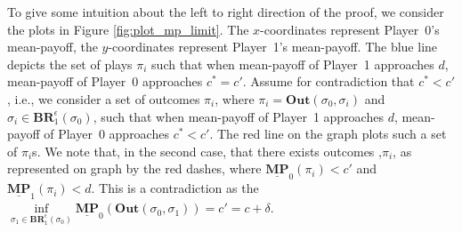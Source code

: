 
To give some intuition about the left to right direction of the proof, we consider the plots in Figure \ref{fig:plot_mp_limit}. The $x$-coordinates represent Player~0's mean-payoff, the $y$-coordinates represent Player~1's mean-payoff. The blue line depicts the set of plays $\pi_i$ such that when mean-payoff of Player~1 approaches $d$, mean-payoff of Player~0 approaches $c^* = c'$. Assume for contradiction that $c^* < c'$, i.e., we consider a set of outcomes $\pi_i$, where $\pi_i=\mathbf{Out}(\sigma_0, \sigma_i)$ and $\sigma_i \in \mathbf{BR}_1^{\epsilon}(\sigma_0)$, such that when mean-payoff of Player~1 approaches $d$, mean-payoff of Player~0 approaches $c^* < c'$. The red line on the graph plots such a set of $\pi_i$s. We note that, in the second case, that there exists outcomes ,$\pi_i$, as represented on graph by the red dashes, where $\underline{\mathbf{MP}}_0(\pi_i) < c'$ and $\underline{\mathbf{MP}}_1(\pi_i) < d$. This is a contradiction as the $\inf\limits_{\sigma_1 \in \mathbf{BR}_1^{\epsilon}(\sigma_0)} \underline{\mathbf{MP}}_0(\mathbf{Out}(\sigma_0, \sigma_1)) = c' = c + \delta$. 

